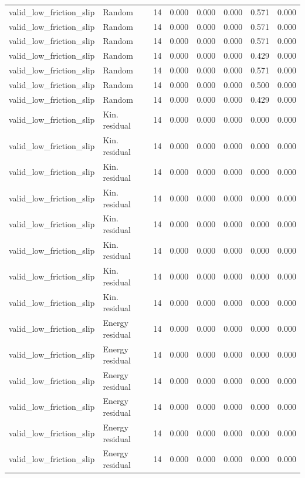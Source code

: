 {\begin{longtable}{llrrrrrr}
valid\_low\_friction\_slip & Random & 14 & 0.000 & 0.000 & 0.000 & 0.571 & 0.000 \\
valid\_low\_friction\_slip & Random & 14 & 0.000 & 0.000 & 0.000 & 0.571 & 0.000 \\
valid\_low\_friction\_slip & Random & 14 & 0.000 & 0.000 & 0.000 & 0.571 & 0.000 \\
valid\_low\_friction\_slip & Random & 14 & 0.000 & 0.000 & 0.000 & 0.429 & 0.000 \\
valid\_low\_friction\_slip & Random & 14 & 0.000 & 0.000 & 0.000 & 0.571 & 0.000 \\
valid\_low\_friction\_slip & Random & 14 & 0.000 & 0.000 & 0.000 & 0.500 & 0.000 \\
valid\_low\_friction\_slip & Random & 14 & 0.000 & 0.000 & 0.000 & 0.429 & 0.000 \\
valid\_low\_friction\_slip & Kin. residual & 14 & 0.000 & 0.000 & 0.000 & 0.000 & 0.000 \\
valid\_low\_friction\_slip & Kin. residual & 14 & 0.000 & 0.000 & 0.000 & 0.000 & 0.000 \\
valid\_low\_friction\_slip & Kin. residual & 14 & 0.000 & 0.000 & 0.000 & 0.000 & 0.000 \\
valid\_low\_friction\_slip & Kin. residual & 14 & 0.000 & 0.000 & 0.000 & 0.000 & 0.000 \\
valid\_low\_friction\_slip & Kin. residual & 14 & 0.000 & 0.000 & 0.000 & 0.000 & 0.000 \\
valid\_low\_friction\_slip & Kin. residual & 14 & 0.000 & 0.000 & 0.000 & 0.000 & 0.000 \\
valid\_low\_friction\_slip & Kin. residual & 14 & 0.000 & 0.000 & 0.000 & 0.000 & 0.000 \\
valid\_low\_friction\_slip & Kin. residual & 14 & 0.000 & 0.000 & 0.000 & 0.000 & 0.000 \\
valid\_low\_friction\_slip & Energy residual & 14 & 0.000 & 0.000 & 0.000 & 0.000 & 0.000 \\
valid\_low\_friction\_slip & Energy residual & 14 & 0.000 & 0.000 & 0.000 & 0.000 & 0.000 \\
valid\_low\_friction\_slip & Energy residual & 14 & 0.000 & 0.000 & 0.000 & 0.000 & 0.000 \\
valid\_low\_friction\_slip & Energy residual & 14 & 0.000 & 0.000 & 0.000 & 0.000 & 0.000 \\
valid\_low\_friction\_slip & Energy residual & 14 & 0.000 & 0.000 & 0.000 & 0.000 & 0.000 \\
valid\_low\_friction\_slip & Energy residual & 14 & 0.000 & 0.000 & 0.000 & 0.000 & 0.000 \\

\end{longtable}}
